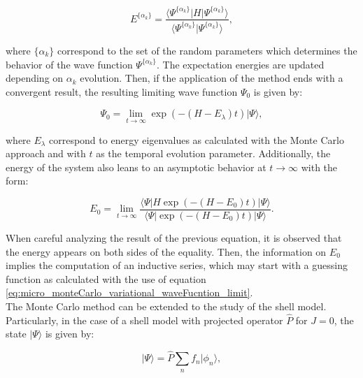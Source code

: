 \documentclass[openany]{book}
\begin{document}
\begin{equation}\label{eq:micro_monteCarlo_variational_energy_expectation}
	E^{\{\alpha_k\}} =  \frac{\langle \Psi^{\{\alpha_k\}} | H |  \Psi^{\{\alpha_k\}} \rangle}{ \langle \Psi^{\{\alpha_k\}} |  \Psi^{\{\alpha_k\}} \rangle},
\end{equation}

where $\{\alpha_k\}$ correspond to the set of the random parameters which determines the behavior of the wave function
 $\Psi^{\{\alpha_k\}}$. The expectation energies are updated depending on $\alpha_k$ evolution. Then, if the application of the method ends with a convergent result, the resulting limiting wave function $\Psi_0$ is given by:

\begin{equation}\label{eq:micro_monteCarlo_variational_waveFucntion_limit}
	\Psi_0 = \lim_{t \rightarrow \infty } \exp {(-(H - E_\lambda)t)} |\Psi \rangle,
\end{equation}

where $E_\lambda$ correspond to energy eigenvalues as calculated with the Monte Carlo approach and with $t$ as the temporal evolution parameter. Additionally, the energy of the system also leans to an asymptotic behavior at $t \rightarrow \infty$ with the form:

\begin{equation}\label{eq:micro_monteCarlo_variational_energy_limit}
	E_0 = \lim_{t \rightarrow \infty } {\frac{\langle \Psi | H \exp (-(H - E_0)t) | \Psi \rangle }{\langle \Psi | \exp (-(H - E_0)t) | \Psi \rangle}}.
\end{equation}

When careful analyzing the result of the previous equation, it is observed that the energy appears on both sides of the equality. Then, the information on $E_0$ implies the computation of an inductive series, which may start with a guessing function as calculated with the use of equation \ref{eq:micro_monteCarlo_variational_waveFucntion_limit}.\\

The Monte Carlo method can be extended to the study of the shell model. Particularly, in the case of a shell model with projected operator $\hat P$ for $J = 0$, the state $| \Psi \rangle$ is given by:
	
\begin{equation}\label{eq:micro_monteCarlo_projectedWaveFunction}
	| \Psi \rangle = \hat P \sum_{n} {f_n |\phi_n \rangle},
\end{equation}
\end{document}
